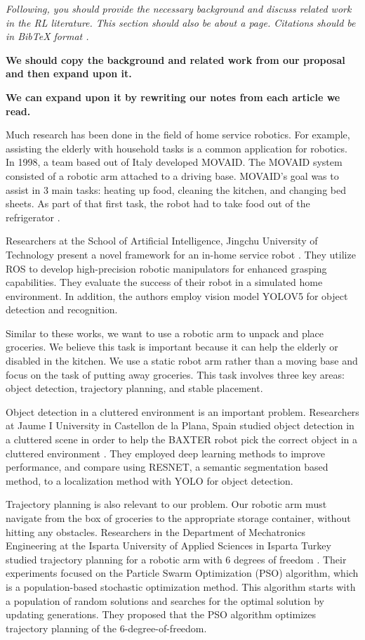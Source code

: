 \documentclass{article}
\begin{document}
\textit{Following, you should provide the necessary background and discuss related work in the RL literature. This section should also be about a page. Citations should be in BibTeX format \citep{thrun2005probabilistic}.}

\textbf{We should copy the background and related work from our proposal and then expand upon it.}


\textbf{We can expand upon it by rewriting our notes from each article we read.}

Much research has been done in the field of home service robotics. For example, assisting the elderly with household tasks is a common application for robotics. In 1998, a team based out of Italy developed MOVAID. The MOVAID system consisted of a robotic arm attached to a driving base. MOVAID's goal was to assist in 3 main tasks: heating up food, cleaning the kitchen, and changing bed sheets. As part of that first task, the robot had to take food out of the refrigerator \cite{doi:10.3233/TAD-1999-10202}. 

Researchers at the School of Artificial Intelligence, Jingchu University of Technology present a novel framework for an in-home service robot \cite{11179321}. They utilize ROS to develop high-precision robotic manipulators
for enhanced grasping capabilities. They evaluate the success of their robot in a simulated home environment. In addition, the authors employ vision model YOLOV5 for object detection and recognition.

Similar to these works, we want to use a robotic arm to unpack and place groceries. We believe this task is important because it can help the elderly or disabled in the kitchen. We use a static robot arm rather than a moving base and focus on the task of putting away groceries. This task involves three key areas: object detection, trajectory planning, and stable placement.

Object detection in a cluttered environment is an important problem. Researchers at Jaume I University in Castellon de la Plana, Spain studied object detection in a cluttered scene in order to help the BAXTER robot pick the correct object in a cluttered environment \cite{10.1145/3164541.3164628}. They employed deep learning methods to improve performance, and compare using RESNET, a semantic segmentation based method, to a localization method with YOLO for object detection. 

Trajectory planning is also relevant to our problem. Our robotic arm must navigate from the box of groceries to the appropriate storage container, without hitting any obstacles. Researchers in the Department of Mechatronics Engineering at the Isparta University of Applied Sciences in Isparta Turkey studied trajectory planning for a robotic arm with 6 degrees of freedom \cite{EKREM2023106099}. Their experiments focused on the Particle Swarm Optimization (PSO) algorithm, which is a population-based stochastic optimization method. This algorithm starts with a population of random solutions and searches for the optimal solution by updating generations. They proposed that the PSO algorithm optimizes trajectory planning of the 6-degree-of-freedom. 
\end{document}
